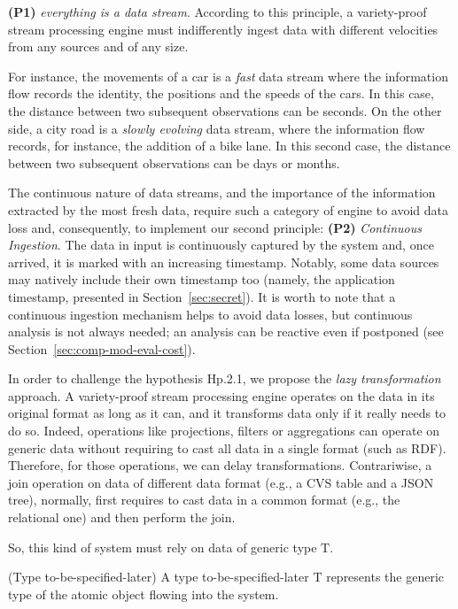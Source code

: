 \textbf{(P1)} \textit{everything is a data stream}. According to this principle, a variety-proof stream processing engine must indifferently ingest data with different velocities from any sources and of any size. 

For instance, the movements of a car is a \textit{fast} data stream where the information flow records the identity, the positions and the speeds of the cars. In this case, the distance between two subsequent observations can be seconds. On the other side, a city road is a \textit{slowly evolving} data stream, where the information flow records, for instance, the addition of a bike lane.
In this second case, the distance between two subsequent observations can be days or months. 

The continuous nature of data streams, and the importance of the information extracted by the most fresh data, require such a category of engine to avoid data loss and, consequently, to implement our second principle: \textbf{(P2)} \textit{Continuous Ingestion}. The data in input is continuously captured by the system and, once arrived, it is marked with an increasing timestamp. Notably, some data sources may natively include their own timestamp too (namely, the application timestamp, presented in Section~\ref{sec:secret}). It is worth to note that a continuous ingestion mechanism helps to avoid data losses, but continuous analysis is not always needed; an analysis can be reactive even if postponed (see Section~\ref{sec:comp-mod-eval-cost}).

In order to challenge the hypothesis \textsf{Hp.2.1}, we propose the \textit{lazy transformation} approach. 
A variety-proof stream processing engine operates on the data in its original format as long as it can, and it transforms data only if it really needs to do so. Indeed, operations like projections, filters or aggregations can operate on generic data without requiring to cast all data in a single format (such as RDF). Therefore, for those operations, we can delay transformations. Contrariwise, a join operation on data of different data format (e.g., a CVS table and a JSON tree), normally, first requires to cast data in a common format (e.g., the relational one) and then perform the join. 

So, this kind of system must rely on data of generic type $\mathrm{T}$.

\begin{Definition}
(Type to-be-specified-later) A type to-be-specified-later $\mathrm{T}$ represents the generic type of the atomic object flowing into the system.
\end{Definition}

